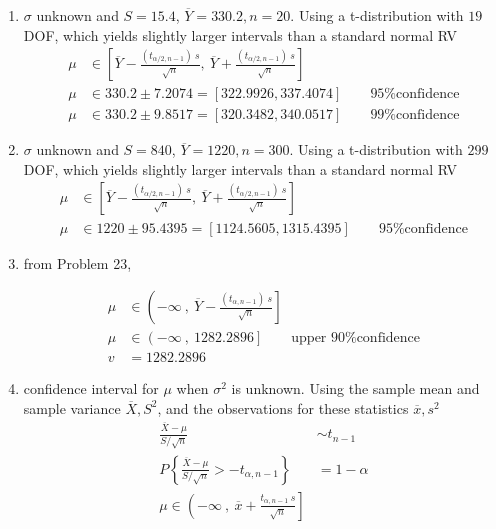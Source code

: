 \begin{enumerate}
	
	\item $ \sigma $ unknown and $ S = 15.4 $, $ \overline{Y} = 330.2, n = 20$. Using a t-distribution with $ 19 $ DOF, which yields slightly larger intervals than a standard normal RV\\
	
		\begin{align}
			\mu &\in \left[ \overline{Y} - \frac{(t_{\alpha/2, n-1})\ s}{\sqrt{n}}, \ \overline{Y} + \frac{(t_{\alpha/2, n-1})\ s}{\sqrt{n}} \right] \nonumber \\
			\mu &\in 330.2 \pm 7.2074 = [322.9926, 337.4074] \qquad \text{95\% confidence} \nonumber \\
			\mu &\in 330.2 \pm 9.8517 = [320.3482, 340.0517] \qquad \text{99\% confidence}
		\end{align}
	
	
	\item $ \sigma $ unknown and $ S = 840 $, $ \overline{Y} = 1220, n = 300$. Using a t-distribution with $ 299 $ DOF, which yields slightly larger intervals than a standard normal RV\\
	
		\begin{align}
			\mu &\in \left[ \overline{Y} - \frac{(t_{\alpha/2, n-1})\ s}{\sqrt{n}}, \ \overline{Y} + \frac{(t_{\alpha/2, n-1})\ s}{\sqrt{n}} \right] \nonumber \\
			\mu &\in 1220 \pm 95.4395 = [1124.5605, 1315.4395] \qquad \text{95\% confidence} 
		\end{align}
	
	
	\item from Problem 23,
	
		\begin{align}
			\mu &\in \left(-\infty\ ,\  \overline{Y} - \frac{(t_{\alpha, n-1})\ s}{\sqrt{n}} \right] \nonumber \\
			\mu &\in \left(-\infty\ ,\ 1282.2896  \right] \qquad \text{upper 90\% confidence} \nonumber \\
			v &= 1282.2896
		\end{align}
	
	
	\item confidence interval for $ \mu $ when $ \sigma^2 $ is unknown. Using the sample mean and sample variance $ \overline{X}, S^2 $, and the observations for these statistics $ \overline{x}, s^2 $\\
	
		\begin{align}
			\frac{\overline{X} - \mu}{S/\sqrt{n}} &\sim t_{n-1} \nonumber \\
			P \left\{ \frac{\overline{X} - \mu}{S/\sqrt{n}} > -t_{\alpha, n-1}\right\} &= 1 - \alpha \nonumber \\
			\mu \in \left( -\infty\ ,\ \overline{x} + \frac{t_{\alpha, n-1}\ s}{\sqrt{n}} \right]
		\end{align}
	

\end{enumerate}
